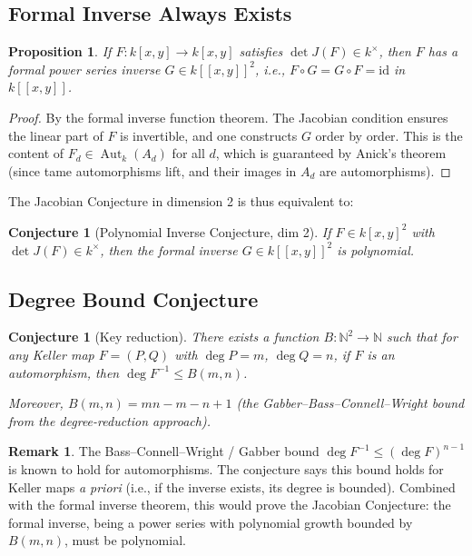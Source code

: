 \documentclass[12pt,a4paper]{article}
\newtheorem{proposition}[theorem]{Proposition}
\newtheorem{conjecture}[theorem]{Conjecture}
\theoremstyle{definition}
\newtheorem{remark}[theorem]{Remark}
\newcommand{\NN}{\mathbb{N}}
\newcommand{\kk}{k}
\newcommand{\Aut}{\operatorname{Aut}}
\begin{document}
\subsection{Formal Inverse Always Exists}

\begin{proposition}
If $F: \kk[x,y] \to \kk[x,y]$ satisfies $\det J(F) \in \kk^\times$, then $F$ has a
formal power series inverse $G \in \kk[[x,y]]^2$, i.e., $F \circ G = G \circ F = \mathrm{id}$
in $\kk[[x,y]]$.
\end{proposition}

\begin{proof}
By the formal inverse function theorem. The Jacobian condition ensures the linear part of $F$
is invertible, and one constructs $G$ order by order. This is the content of
$F_d \in \Aut_\kk(A_d)$ for all $d$, which is guaranteed by Anick's theorem (since tame
automorphisms lift, and their images in $A_d$ are automorphisms).
\end{proof}

The Jacobian Conjecture in dimension 2 is thus equivalent to:

\begin{conjecture}[Polynomial Inverse Conjecture, dim 2]
If $F \in \kk[x,y]^2$ with $\det J(F) \in \kk^\times$, then the formal inverse
$G \in \kk[[x,y]]^2$ is polynomial.
\end{conjecture}

\subsection{Degree Bound Conjecture}

\begin{conjecture}[Key reduction]
There exists a function $B: \NN^2 \to \NN$ such that for any Keller map $F = (P,Q)$ with
$\deg P = m$, $\deg Q = n$, if $F$ is an automorphism, then $\deg F^{-1} \leq B(m,n)$.

Moreover, $B(m,n) = mn - m - n + 1$ (the Gabber--Bass--Connell--Wright bound from the
degree-reduction approach).
\end{conjecture}

\begin{remark}
The Bass--Connell--Wright / Gabber bound $\deg F^{-1} \leq (\deg F)^{n-1}$ is known to hold
for automorphisms. The conjecture says this bound holds for Keller maps \emph{a priori}
(i.e., if the inverse exists, its degree is bounded). Combined with the formal inverse
theorem, this would prove the Jacobian Conjecture: the formal inverse, being a power series
with polynomial growth bounded by $B(m,n)$, must be polynomial.
\end{remark}
\end{document}
